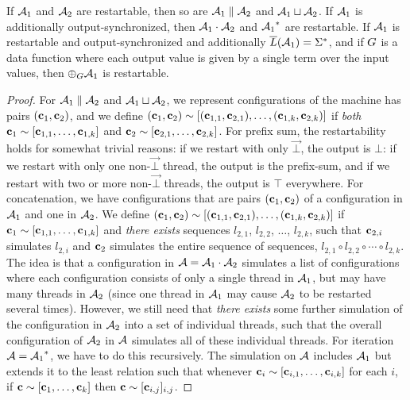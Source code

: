 \begin{theorem}
\label{thm:restartability-preserved}
If $\mathcal{A}_1$ and $\mathcal{A}_2$ are restartable, then so
are $\mathcal{A}_1 \; \| \; \mathcal{A}_2$ and $\mathcal{A}_1 \sqcup \mathcal{A}_2$.
If $\mathcal{A}_1$ is additionally output-synchronized, then $\mathcal{A}_1 \cdot \mathcal{A}_2$ and ${{\mathcal{A}_1}^{*}}$ are restartable.
If $\mathcal{A}_1$ is restartable and output-synchronized and additionally $\overline{L}(\mathcal{A}_1) = \Sigma^{*}$, and if $G$ is a data function where each output value is given by a single term over the input values, then $\prefixsum{\DT_1}{\DF}$ is restartable.
\end{theorem}
\begin{proof}
For $\mathcal{A}_1 \; \| \; \mathcal{A}_2$ and $\mathcal{A}_1 \sqcup \mathcal{A}_2$, we represent configurations of the machine has pairs $(\textbf{c}_1, \textbf{c}_2)$, and we define $(\textbf{c}_1, \textbf{c}_2) \sim [(\textbf{c}_{1,1},\textbf{c}_{2,1}),\ldots,(\textbf{c}_{1,k},\textbf{c}_{2,k})]$ if \emph{both} $\textbf{c}_1 \sim [\textbf{c}_{1,1},\ldots,\textbf{c}_{1,k}]$ and $\textbf{c}_2 \sim [\textbf{c}_{2,1},\ldots,\textbf{c}_{2,k}]$.
For prefix sum, the restartability holds for somewhat trivial reasons: if we restart with only $\vec{\bot}$, the output is $\bot$: if we restart with only one non-$\vec{\bot}$ thread, the output is the prefix-sum, and if we restart with two or more non-$\vec{\bot}$ threads, the output is $\top$ everywhere.
For concatenation, we have configurations that are pairs $(\textbf{c}_1, \textbf{c}_2)$ of a configuration in $\mathcal{A}_1$ and one in $\mathcal{A}_2$. We define $(\textbf{c}_1, \textbf{c}_2) \sim [(\textbf{c}_{1,1},\textbf{c}_{2,1}),\ldots,(\textbf{c}_{1,k},\textbf{c}_{2,k})]$ if $\textbf{c}_1 \sim [\textbf{c}_{1,1},\ldots,\textbf{c}_{1,k}]$ and \emph{there exists} sequences $l_{2,1}$, $l_{2,2}$, $\ldots$, $l_{2,k}$, such that $\textbf{c}_{2,i}$ simulates $l_{2,i}$ and $\textbf{c}_2$ simulates the entire sequence of sequences, $l_{2,1} \circ l_{2,2} \circ \cdots \circ l_{2,k}$. The idea is that a configuration in $\mathcal{A} = \mathcal{A}_1 \cdot \mathcal{A}_2$ simulates a list of configurations where each configuration consists of only a single thread in $\mathcal{A}_1$, but may have many threads in $\mathcal{A}_2$ (since one thread in $\mathcal{A}_1$ may cause $\mathcal{A}_2$ to be restarted several times). However, we still need that \emph{there exists} some further simulation of the configuration in $\mathcal{A}_2$ into a set of individual threads, such that the overall configuration of $\mathcal{A}_2$ in $\mathcal{A}$ simulates all of these individual threads.
For iteration $\mathcal{A} = {{\mathcal{A}_1}^{*}}$, we have to do this recursively. The simulation on $\mathcal{A}$ includes $\mathcal{A}_1$ but extends it to the least relation such that whenever $\textbf{c}_i \sim [\textbf{c}_{i,1}, \ldots, \textbf{c}_{i,k}]$ for each $i$, if $\textbf{c} \sim [\textbf{c}_1, \ldots, \textbf{c}_k]$ then $\textbf{c} \sim [\textbf{c}_{i,j}]_{i,j}$.
\end{proof}

